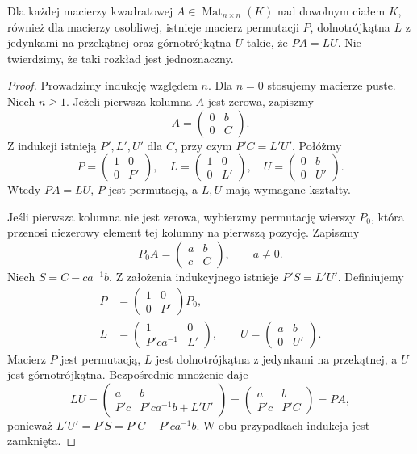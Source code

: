 \begin{twierdzenie}
\label{thm:lin15-plu}
Dla każdej macierzy kwadratowej
\(A\in\operatorname{Mat}_{n\times n}(K)\)
nad dowolnym ciałem \(K\),
również dla macierzy osobliwej,
istnieje macierz permutacji \(P\),
dolnotrójkątna \(L\) z jedynkami
na przekątnej oraz górnotrójkątna \(U\)
takie, że \(PA=LU\).
Nie twierdzimy, że taki
rozkład jest jednoznaczny.
\end{twierdzenie}
\begin{proof}
Prowadzimy indukcję względem \(n\).
Dla \(n=0\) stosujemy macierze puste.
Niech \(n\ge1\).
Jeżeli pierwsza kolumna \(A\)
jest zerowa, zapiszmy
\[
 A=\begin{pmatrix}0&b\\0&C\end{pmatrix}.
\]
Z indukcji istnieją
\(P',L',U'\) dla \(C\), przy czym
\(P'C=L'U'\).
Połóżmy
\[
 P=\begin{pmatrix}1&0\\0&P'\end{pmatrix},
 \quad
 L=\begin{pmatrix}1&0\\0&L'\end{pmatrix},
 \quad
 U=\begin{pmatrix}0&b\\0&U'\end{pmatrix}.
\]
Wtedy \(PA=LU\),
\(P\) jest permutacją,
a \(L,U\) mają wymagane
kształty.

Jeśli pierwsza kolumna
nie jest zerowa, wybierzmy
permutację wierszy \(P_0\),
która przenosi niezerowy
element tej kolumny
na pierwszą pozycję.
Zapiszmy
\[
 P_0A=\begin{pmatrix}a&b\\c&C\end{pmatrix},
 \qquad a\ne0.
\]
Niech
\(S=C-ca^{-1}b\).
Z założenia indukcyjnego
istnieje
\(P'S=L'U'\).
Definiujemy
\[
 \begin{split}
 P&=\begin{pmatrix}1&0\\0&P'\end{pmatrix}P_0,\\
 L&=\begin{pmatrix}1&0\\P'ca^{-1}&L'\end{pmatrix},
 \qquad
 U=\begin{pmatrix}a&b\\0&U'\end{pmatrix}.
 \end{split}
\]
Macierz \(P\) jest permutacją,
\(L\) jest dolnotrójkątna
z jedynkami na przekątnej,
a \(U\) jest górnotrójkątna.
Bezpośrednie mnożenie daje
\[
 LU=
 \begin{pmatrix}
 a&b\\P'c&P'ca^{-1}b+L'U'
 \end{pmatrix}
 =
 \begin{pmatrix}
 a&b\\P'c&P'C
 \end{pmatrix}
 =PA,
\]
ponieważ
\(L'U'=P'S=P'C-P'ca^{-1}b\).
W obu przypadkach indukcja
jest zamknięta.
\end{proof}

